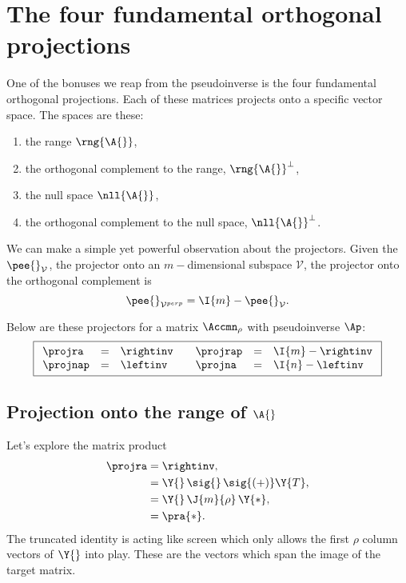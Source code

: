 \section[The fundamental projections]{The four fundamental orthogonal projections}
\label{sec:orthproj}

One of the bonuses we reap from the pseudoinverse is the four fundamental orthogonal projections. Each of these matrices projects onto a specific vector space. The spaces are these:
\begin{enumerate}
\item the range $\rng{\A{}}$,
\item the orthogonal complement to the range, $\rng{\A{}}^{\perp}$,
\item the null space $\nll{\A{}}$,
\item the orthogonal complement to the null space, $\nll{\A{}}^{\perp}$.
\end{enumerate}

We can make a simple yet powerful observation about the projectors.
Given the $\pee{}_{\mathcal{V}}$, the projector onto an $m-$dimensional subspace $\mathcal{V}$, the projector onto the orthogonal complement is
\begin{equation}
  \pee{}_{\mathcal{V}^{perp}} = \I{m}-\pee{}_{\mathcal{V}}.
\end{equation}

Below are these projectors for a matrix $\Accmn_{\rho}$ with pseudoinverse $\Ap$:
\begin{equation}
\boxed{
  \begin{array}{lcllcl}
    \projra& = &\rightinv & \quad \projrap& = &\I{m}-\rightinv\\
    \projnap& =& \leftinv & \quad \projna& = &\I{n}-\leftinv\\    
  \end{array}
  }
  \label{eq:fourprojpi}
\end{equation}

\subsection{Projection onto the range of $\A{}$}
Let's explore the matrix product
\begin{equation}
  \begin{split}
    \projra &= \rightinv,\\
    &= \Y{}\,\sig{}\,\sig{(+)}\Y{T},\\
    & = \Y{}\,\J{m}{\rho}\,\Y{*}, \\
    & = \pra{*}.
  \end{split}
\end{equation}
The truncated identity is acting like screen which only allows the first $\rho$ column vectors of $\Y{}$ into play. These are the vectors which span the image of the target matrix.

